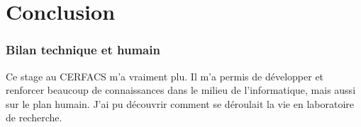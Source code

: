 \chapter*{Conclusion}

\subsection*{Bilan technique et humain}

Ce stage au CERFACS m'a vraiment plu. Il m'a permis de développer et renforcer beaucoup de connaissances dans le milieu de l'informatique, mais aussi sur le plan humain. J'ai pu découvrir comment se déroulait la vie en laboratoire de recherche.


